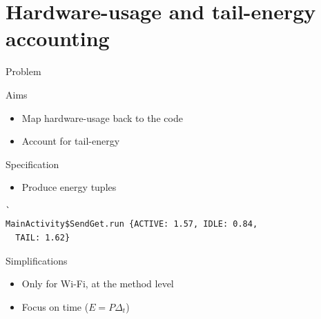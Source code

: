 \section{Hardware-usage and tail-energy accounting}
\begin{frame}[fragile]{Problem}
\begin{block}{Aims}
\begin{itemize}
\item Map hardware-usage back to the code
\item Account for tail-energy
\end{itemize}
\end{block}
%
\begin{block}{Specification}
\begin{itemize}
\item Produce energy tuples
\end{itemize}
\begin{lstlisting}`
MainActivity$SendGet.run {ACTIVE: 1.57, IDLE: 0.84,
  TAIL: 1.62}
\end{lstlisting}
\end{block}
%
\begin{block}{Simplifications}
\begin{itemize}
\item Only for Wi-Fi, at the method level
\item Focus on time ($E= P \Delta_t$)
\end{itemize}
\end{block}
\end{frame}
%
%
